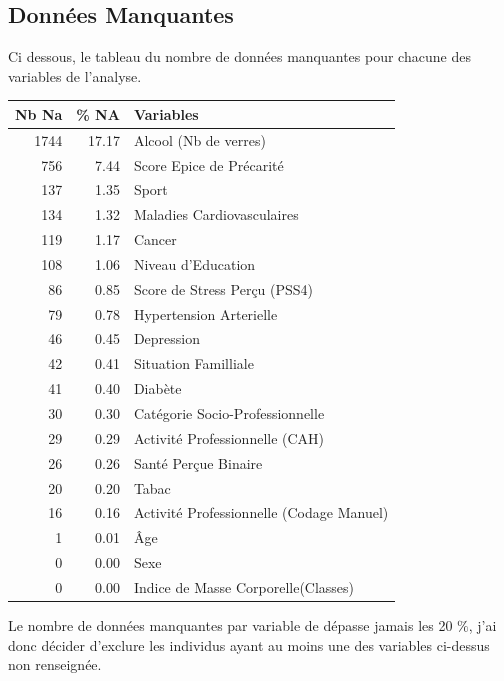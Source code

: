\documentclass{book}
\begin{document}
 
\subsection{Données Manquantes}

\begin{center}
\noindent
Ci dessous, le tableau du nombre de données manquantes pour chacune des variables de l'analyse.\\
\bigskip

\begin{tabular}{rrl}
\toprule
Nb Na & \% NA & Variables\\
\midrule

1744 & 17.17 & Alcool (Nb de verres)\\
756 & 7.44 & Score Epice de Précarité\\
137 & 1.35 & Sport\\

134 & 1.32 & Maladies Cardiovasculaires\\
119 & 1.17 & Cancer\\
108 & 1.06 & Niveau d'Education\\
86 & 0.85 & Score de Stress Perçu (PSS4)\\
79 & 0.78 & Hypertension Arterielle\\

46 & 0.45 & Depression\\
42 & 0.41 & Situation Familliale\\
41 & 0.40 & Diabète\\
30 & 0.30 & Catégorie Socio-Professionnelle\\

29 & 0.29 & Activité Professionnelle (CAH)\\
26 & 0.26 & Santé Perçue Binaire\\
20 & 0.20 & Tabac\\
16 & 0.16 & Activité Professionnelle (Codage Manuel)\\
1 & 0.01 & Âge\\

0 & 0.00 & Sexe\\
0 & 0.00 & Indice de Masse Corporelle(Classes)\\
\bottomrule
\end{tabular}
\end{center}

\noindent
Le nombre de données manquantes par variable de dépasse jamais les 20 $\%$, j'ai donc décider d'exclure les individus ayant au moins une des variables ci-dessus non renseignée.\\
\end{document}
